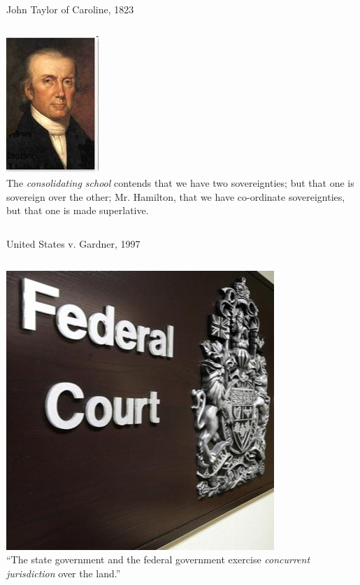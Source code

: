 \begin{frame}{John Taylor of Caroline, 1823}
    \begin{columns}[c]
            \centering
            \includegraphics[height=0.4\textheight]{img/john-taylor-of-caroline.png} \\
        \column{0.5\textheight}
            The \emph{consolidating school} contends that we have two
            sovereignties; but that one is sovereign over the other; Mr.
            Hamilton, that we have co-ordinate sovereignties, but that one is
            made superlative.
    \end{columns}
\end{frame}

\begin{frame}{United States v. Gardner, 1997}
    \begin{columns}[c]
            \centering
            \includegraphics[height=0.4\textheight]{img/federal-court.png} \\
        \column{0.5\textheight}
            ``The state government and the federal government exercise \emph{concurrent jurisdiction} over the land.''
    \end{columns}
\end{frame}

